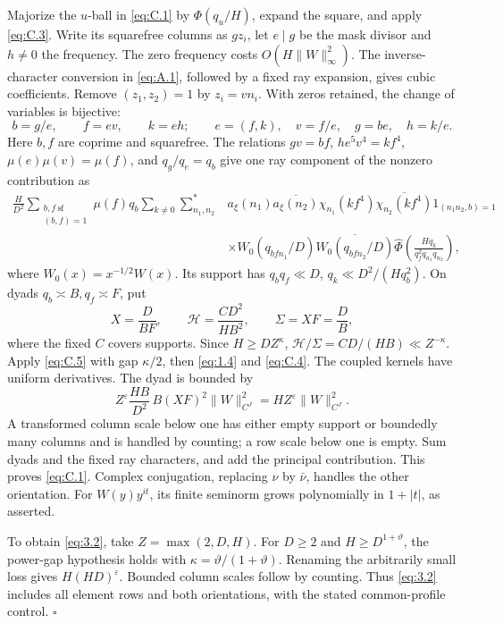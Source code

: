 \documentclass[11pt,a4paper]{article}
\begin{document}
Majorize the \(u\)-ball in \eqref{eq:C.1} by \(\Phi(q_u/H)\), expand the square, and apply \eqref{eq:C.3}. Write its squarefree columns as \(gz_i\), let \(e\mid g\) be the mask divisor and \(h\ne0\) the frequency. The zero frequency costs \(O(H\|W\|_\infty^2)\). The inverse-character conversion in \eqref{eq:A.1}, followed by a fixed ray expansion, gives cubic coefficients. Remove \((z_1,z_2)=1\) by \(z_i=vn_i\). With zeros retained, the change of variables is bijective: \[
b=g/e,\qquad f=ev,\qquad k=eh;
\qquad e=(f,k),\quad v=f/e,\quad g=be,\quad h=k/e.
\tag{C.19}\label{eq:C.19}
\] Here \(b,f\) are coprime and squarefree. The relations \(gv=bf\), \(he^5v^4=kf^4\), \(\mu(e)\mu(v)=\mu(f)\), and \(q_g/q_e=q_b\) give one ray component of the nonzero contribution as \[
\begin{aligned}
\frac H{D^2}\sum_{\substack{b,f\ \mathrm{sf}\\(b,f)=1}}\mu(f)q_b
\sum_{k\ne0}\sum_{n_1,n_2}^{*}
&a_\xi(n_1)\overline{a_\xi(n_2)}
\chi_{n_1}(kf^4)\overline{\chi_{n_2}(kf^4)}1_{(n_1n_2,b)=1}\\
&\times W_0(q_{bfn_1}/D)\overline{W_0(q_{bfn_2}/D)}
\widehat\Phi\!\left(\frac{Hq_k}{q_f^2q_{n_1}q_{n_2}}\right),
\end{aligned}
\tag{C.20}\label{eq:C.20}
\] where \(W_0(x)=x^{-1/2}W(x)\). Its support has \(q_bq_f\ll D\), \(q_k\ll D^2/(Hq_b^2)\). On dyads \(q_b\asymp B,q_f\asymp F\), put \[
X=\frac D{BF},\qquad \mathcal H=\frac{C D^2}{HB^2},\qquad \Sigma=XF=\frac DB,
\] where the fixed \(C\) covers supports. Since \(H\ge DZ^\kappa\), \(\mathcal H/\Sigma=CD/(HB)\ll Z^{-\kappa}\). Apply \eqref{eq:C.5} with gap \(\kappa/2\), then \eqref{eq:1.4} and \eqref{eq:C.4}. The coupled kernels have uniform derivatives. The dyad is bounded by \[
Z^\varepsilon\frac{HB}{D^2}\,B(XF)^2\|W\|_{C^J}^2
=HZ^\varepsilon\|W\|_{C^J}^2.
\] A transformed column scale below one has either empty support or boundedly many columns and is handled by counting; a row scale below one is empty. Sum dyads and the fixed ray characters, and add the principal contribution. This proves \eqref{eq:C.1}. Complex conjugation, replacing \(\nu\) by \(\bar\nu\), handles the other orientation. For \(W(y)y^{it}\), its finite seminorm grows polynomially in \(1+|t|\), as asserted.

To obtain \eqref{eq:3.2}, take \(Z=\max(2,D,H)\). For \(D\ge2\) and \(H\ge D^{1+\vartheta}\), the power-gap hypothesis holds with \(\kappa=\vartheta/(1+\vartheta)\). Renaming the arbitrarily small loss gives \(H(HD)^\varepsilon\). Bounded column scales follow by counting. Thus \eqref{eq:3.2} includes all element rows and both orientations, with the stated common-profile control. \hfill\(\square\)
\end{document}
